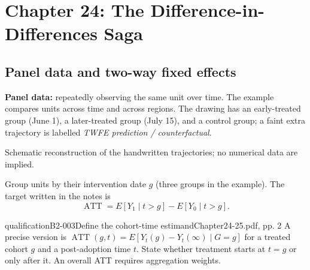 \section{Chapter 24: The Difference-in-Differences Saga}
\subsection{Panel data and two-way fixed effects}
\textbf{Panel data:} repeatedly observing the same unit over time. The example compares units across time and across regions. The drawing has an early-treated group (June 1), a later-treated group (July 15), and a control group; a faint extra trajectory is labelled \emph{TWFE prediction / counterfactual}.
\begin{center}

{\small Schematic reconstruction of the handwritten trajectories; no numerical data are implied.}
\end{center}
Group units by their intervention date \(g\) (three groups in the example).
 The target written in the notes is
\[
\operatorname{ATT}=E[Y_1\mid t>g]-E[Y_0\mid t>g].
\]
\begin{reviewnote}{qualification}{B2-003}{Define the cohort-time estimand}{Chapter24-25.pdf, pp. 2}
A precise version is \(\operatorname{ATT}(g,t)=E[Y_t(g)-Y_t(\infty)\mid G=g]\) for a treated cohort \(g\) and a post-adoption time \(t\). State whether treatment starts at \(t=g\) or only after it. An overall ATT requires aggregation weights.
\par{}
\end{reviewnote}

